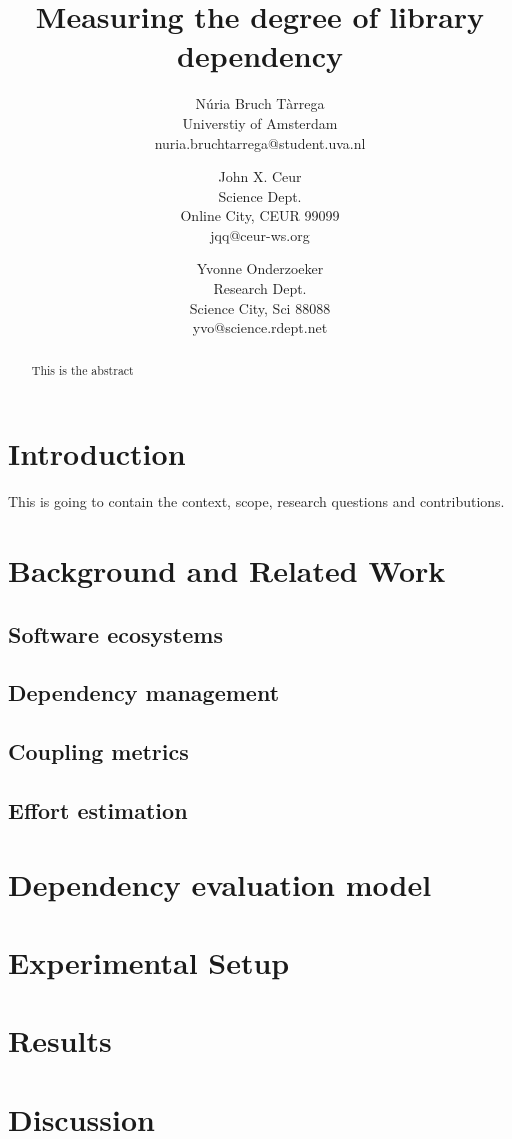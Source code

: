\documentclass[a4paper]{article}
\title{Measuring the degree of library dependency}
\author{
Núria Bruch Tàrrega \\ Universtiy of Amsterdam \\ nuria.bruchtarrega@student.uva.nl
\and
John X. Ceur \\ Science Dept.\\
                Online City, CEUR 99099 \\ jqq@ceur-ws.org
\and
Yvonne Onderzoeker \\ Research Dept.\\
                Science City, Sci 88088 \\ yvo@science.rdept.net
}
\begin{document}
\maketitle

\begin{abstract}
This is the abstract
\end{abstract}


\section{Introduction}

This is going to contain the context, scope, research questions and contributions.

\section{Background and Related Work}

\subsection{Software ecosystems}
\subsection{Dependency management}
\subsection{Coupling metrics}
\subsection{Effort estimation}


\section{Dependency evaluation model}



\section{Experimental Setup}



\section{Results}


\section{Discussion}
\end{document}
